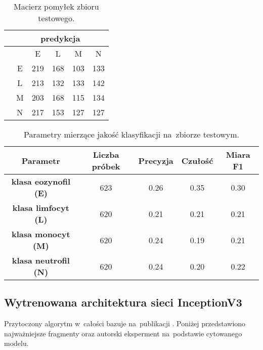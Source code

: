 {\begin{itemize}
\begin{table}[h!]
\centering
\caption[Short Heading]{Macierz pomyłek zbioru testowego.}
\label{tab:kaggle_2_conf_matrix}
\begin{tabular}{|c|c|c|c|c|c|}
\hline
\textbf{}                           & \multicolumn{5}{c|}{\textbf{predykcja}} \\ \hline
{\multirow{5}{*}{\rotatebox[origin=c]{90}{\textbf{klasa}}}} &         & E       & L        & M      & N       \\ \cline{2-6} 
                                    & E       & 219       & 168      & 103      & 133     \\ \cline{2-6} 
                                    & L       & 213       & 132      & 133      & 142      \\ \cline{2-6} 
                                    & M       & 203       & 168      & 115      & 134      \\ \cline{2-6} 
                                    & N       & 217       & 153      & 127      & 127       \\ \hline
\end{tabular}
\end{table}

\end{itemize}
}

\begin{table}[h!]
\centering
\caption[Short Heading]{Parametry mierzące jakość klasyfikacji na~zbiorze testowym.}
\label{tab:kaggle_2_params_val}
\begin{tabular}{|c|c|c|c|c|}
\hline
\textbf{Parametr}                               & \textbf{Liczba próbek} & \textbf{Precyzja} & \textbf{Czułość} & \textbf{Miara F1} \\ \hline
\textbf{klasa eozynofil (E)} & 623 & 0.26   & 0.35   & 0.30   \\ \hline
\textbf{klasa limfocyt (L)} & 620 & 0.21  & 0.21 & 0.21    \\ \hline
\textbf{klasa monocyt (M)} & 620 & 0.24   & 0.19    & 0.21   \\ \hline
\textbf{klasa neutrofil (N)} & 620 & 0.24   & 0.20    & 0.22   \\ \hline
\end{tabular}
\end{table}

\subsection{Wytrenowana architektura sieci InceptionV3}
\label{sec:section_kaggle_3}
Przytoczony algorytm w~całości bazuje na~publikacji \cite{kaggle_3}. Poniżej przedstawiono najważniejsze fragmenty oraz autorski eksperment na~podstawie cytowanego modelu.

